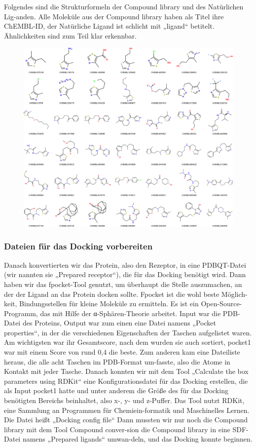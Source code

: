 \documentclass[10pt]{article}
\begin{document}
{    Folgendes sind die Strukturformeln der Compound library und des Natürlichen Lig-anden. Alle Moleküle aus der Compound library haben als Titel ihre ChEMBL-ID, der Natürliche Ligand ist schlicht mit „ligand“ betitelt. Ähnlichkeiten sind zum Teil klar erkennbar.
        \begin{figure}
            \includegraphics[width=\textwidth]{P. Falciparum - ligands - visual}
        \end{figure}


        \subsubsection{Dateien für das Docking vorbereiten}
        Danach konvertierten wir das Protein, also den Rezeptor, in eine PDBQT-Datei (wir nannten sie „Prepared receptor“), die für das Docking benötigt wird.
    Dann haben wir das fpocket-Tool genutzt, um überhaupt die Stelle auszumachen, an der der Ligand an das Protein docken sollte. Fpocket ist die wohl beste Möglich-keit, Bindungsstellen für kleine Moleküle zu ermitteln. Es ist ein Open-Source-Programm, das mit Hilfe der α-Sphären-Theorie arbeitet. Input war die PDB-Datei des Proteins, Output war zum einen eine Datei namens „Pocket properties“, in der die verschiedenen Eigenschaften der Taschen aufgelistet waren. Am wichtigsten war ihr Gesamtscore, nach dem wurden sie auch sortiert, pocket1 war mit einem Score von rund 0,4 die beste.
    Zum anderen kam eine Dateiliste heraus, die alle acht Taschen im PDB-Format um-fasste, also die Atome in Kontakt mit jeder Tasche.
    Danach konnten wir mit dem Tool „Calculate the box parameters using RDKit“ eine Konfigurationsdatei für das Docking erstellen, die als Input pocket1 hatte und unter anderem die Größe des für das Docking benötigten Bereichs beinhaltet, also x-, y- und z-Puffer. Das Tool nutzt RDKit, eine Sammlung an Programmen für Chemiein-formatik und Maschinelles Lernen. Die Datei heißt „Docking config file“
    Dann mussten wir nur noch die Compound library mit dem Tool Compound conver-sion die Compound library in eine SDF-Datei namens „Prepared ligands“ umwan-deln, und das Docking konnte beginnen.

}
\end{document}
